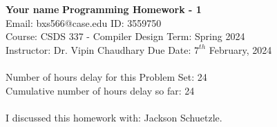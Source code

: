 \documentclass[a4paper, 11pt]{article}
\begin{document}
\noindent
\large\textbf{Your name} \hfill \textbf{Programming Homework - 1}   \\
Email: bxs566@case.edu \hfill ID: 3559750 \\
\normalsize Course: CSDS 337 - Compiler Design \hfill Term: Spring 2024\\
Instructor: Dr. Vipin Chaudhary \hfill Due Date: $7^{th}$ February, 2024 \\ \\
Number of hours delay for this Problem Set: \hfill 24\\
Cumulative number of hours delay so far: \hfill 24\\ \\
I discussed this homework with: \hfill Jackson Schuetzle. \\
\end{document}
